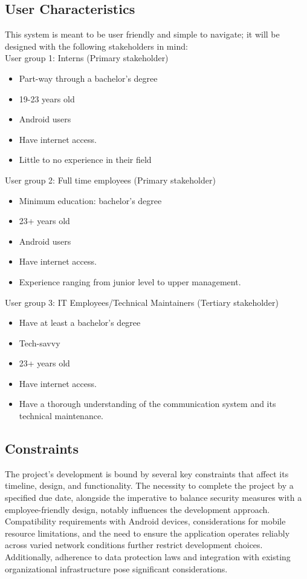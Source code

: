 \documentclass[]{article}
\begin{document}
\subsection{User Characteristics}
\label{sub:user_characteristics}
This system is meant to be user friendly and simple to navigate; it will be designed with the following stakeholders in mind:\\
User group 1: Interns (Primary stakeholder)
\begin{itemize}
    \item Part-way through a bachelor’s degree
    \item 19-23 years old
    \item Android users
    \item Have internet access.
    \item Little to no experience in their field
\end{itemize}

\noindent User group 2: Full time employees (Primary stakeholder)
\begin{itemize}
    \item Minimum education: bachelor’s degree
    \item 23+ years old
    \item Android users
    \item Have internet access.
    \item Experience ranging from junior level to upper management.
\end{itemize}

\noindent User group 3: IT Employees/Technical Maintainers (Tertiary stakeholder)
\begin{itemize}
    \item Have at least a bachelor’s degree
    \item Tech-savvy
    \item 23+ years old
    \item Have internet access.
    \item Have a thorough understanding of the communication system and its technical maintenance.
\end{itemize}

\subsection{Constraints}
\label{sub:constraints}
\hspace{5mm}The project's development is bound by several key constraints that affect its timeline, design, and functionality. The necessity to complete the project by a specified due date, alongside the imperative to balance security measures with a employee-friendly design, notably influences the development approach. Compatibility requirements with Android devices, considerations for mobile resource limitations, and the need to ensure the application operates reliably across varied network conditions further restrict development choices. Additionally, adherence to data protection laws and integration with existing organizational infrastructure pose significant considerations.
\end{document}
